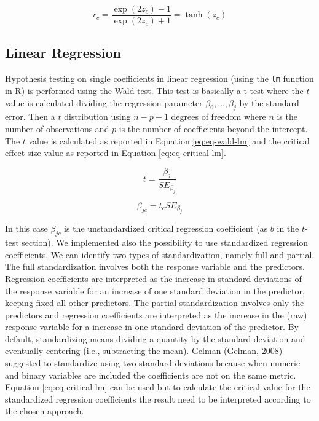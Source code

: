 \documentclass[
  man]{apa7}
\begin{document}
\begin{equation}
    \label{eq:eq-bk-r}
    r_c = \frac{\exp(2z_c)-1}{\exp(2z_c)+1} = \operatorname{tanh}(z_c)
\end{equation}

\hypertarget{linear-regression}{%
\subsection{Linear Regression}\label{linear-regression}}

Hypothesis testing on single coefficients in linear regression (using the \texttt{lm} function in R) is performed using the Wald test. This test is basically a t-test where the \(t\) value is calculated dividing the regression parameter \(\beta_0, \dots, \beta_j\) by the standard error. Then a \(t\) distribution using \(n - p - 1\) degrees of freedom where \(n\) is the number of observations and \(p\) is the number of coefficients beyond the intercept. The \(t\) value is calculated as reported in Equation \eqref{eq:eq-wald-lm} and the critical effect size value as reported in Equation \eqref{eq:eq-critical-lm}.

\begin{equation}
\label{eq:eq-wald-lm}
    t = \frac{\beta_j}{SE_{\beta_j}}
\end{equation}

\begin{equation}
\label{eq:eq-critical-lm}
    \beta_{jc} = t_c SE_{\beta_j}
\end{equation}

In this case \(\beta_{jc}\) is the unstandardized critical regression coefficient (as \(b\) in the \(t\)-test section). We implemented also the possibility to use standardized regression coefficients. We can identify two types of standardization, namely full and partial. The full standardization involves both the response variable and the predictors. Regression coefficients are interpreted as the increase in standard deviations of the response variable for an increase of one standard deviation in the predictor, keeping fixed all other predictors. The partial standardization involves only the predictors and regression coefficients are interpreted as the increase in the (raw) response variable for a increase in one standard deviation of the predictor. By default, standardizing means dividing a quantity by the standard deviation and eventually centering (i.e., subtracting the mean). Gelman (Gelman, 2008) suggested to standardize using two standard deviations because when numeric and binary variables are included the coefficients are not on the same metric. Equation \eqref{eq:eq-critical-lm} can be used but to calculate the critical value for the standardized regression coefficients the result need to be interpreted according to the chosen approach.
\end{document}
